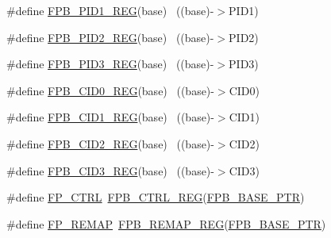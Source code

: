 \begin{DoxyCompactItemize}
\item 
\#define \hyperlink{group___f_p_b___register___accessor___macros_ga8859e6bda39b2725ed2f5d45e22d7b50}{F\+P\+B\+\_\+\+P\+I\+D1\+\_\+\+R\+EG}(base)                                          ~((base)-\/$>$P\+I\+D1)
\item 
\#define \hyperlink{group___f_p_b___register___accessor___macros_gac97cbee200bbd12a267ec742005eaa0f}{F\+P\+B\+\_\+\+P\+I\+D2\+\_\+\+R\+EG}(base)                                          ~((base)-\/$>$P\+I\+D2)
\item 
\#define \hyperlink{group___f_p_b___register___accessor___macros_gabc08353b16dcd1523e16e6cb4f2f6d55}{F\+P\+B\+\_\+\+P\+I\+D3\+\_\+\+R\+EG}(base)                                          ~((base)-\/$>$P\+I\+D3)
\item 
\#define \hyperlink{group___f_p_b___register___accessor___macros_ga0489173b7028d084cc37f751c01c3a45}{F\+P\+B\+\_\+\+C\+I\+D0\+\_\+\+R\+EG}(base)                                          ~((base)-\/$>$C\+I\+D0)
\item 
\#define \hyperlink{group___f_p_b___register___accessor___macros_ga6fb403a75294c6d76d2bdf8156620f33}{F\+P\+B\+\_\+\+C\+I\+D1\+\_\+\+R\+EG}(base)                                          ~((base)-\/$>$C\+I\+D1)
\item 
\#define \hyperlink{group___f_p_b___register___accessor___macros_ga36d0d49963902114ed3fcf12f2a4226a}{F\+P\+B\+\_\+\+C\+I\+D2\+\_\+\+R\+EG}(base)                                          ~((base)-\/$>$C\+I\+D2)
\item 
\#define \hyperlink{group___f_p_b___register___accessor___macros_ga69bcecf152c05571bbcdb2160cacbd45}{F\+P\+B\+\_\+\+C\+I\+D3\+\_\+\+R\+EG}(base)                                          ~((base)-\/$>$C\+I\+D3)
\item 
\#define \hyperlink{group___f_p_b___register___accessor___macros_ga23de55de0fdb50910ba8ab05e187e568}{F\+P\+\_\+\+C\+T\+RL}~\hyperlink{group___f_p_b___register___accessor___macros_ga51c51db7f0fa370f16b973df21399a88}{F\+P\+B\+\_\+\+C\+T\+R\+L\+\_\+\+R\+EG}(\hyperlink{group___f_p_b___peripheral_ga95d994c97f967ce02339465def6bac95}{F\+P\+B\+\_\+\+B\+A\+S\+E\+\_\+\+P\+TR})
\item 
\#define \hyperlink{group___f_p_b___register___accessor___macros_ga359b40159d279babcfaf6832695ba88b}{F\+P\+\_\+\+R\+E\+M\+AP}~\hyperlink{group___f_p_b___register___accessor___macros_gaa4d1a55b94416f3ef869793d4d461e5c}{F\+P\+B\+\_\+\+R\+E\+M\+A\+P\+\_\+\+R\+EG}(\hyperlink{group___f_p_b___peripheral_ga95d994c97f967ce02339465def6bac95}{F\+P\+B\+\_\+\+B\+A\+S\+E\+\_\+\+P\+TR})

\end{DoxyCompactItemize}
